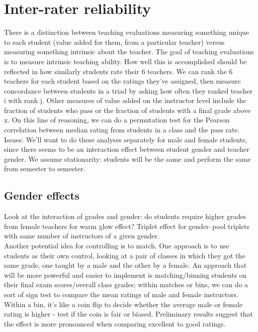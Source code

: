 \documentclass[12pt]{article}
\begin{document}
\section{Inter-rater reliability}
There is a distinction between teaching evaluations measuring something unique to each student 
(value added for them, from a particular teacher) versus 
measuring something intrinsic about the teacher.  
The goal of teaching evaluations is to measure intrinsic teaching ability.  
How well this is accomplished should be reflected in how similarly 
students rate their 6 teachers.
We can rank the 6 teachers for each student based on the ratings 
they've assigned, then measure concordance between students in a triad by asking how often they ranked teacher i with rank j.
Other measures of value added on the instructor level include the fraction of 
students who pass or the fraction of students with a final grade above x.  
On this line of reasoning, we can do a permutation test for the 
Pearson correlation between median rating from students in a class and the pass rate.
Issues:
We'll want to do these analyses separately for male and female students, 
since there seems to be an interaction effect between student gender and teacher gender.
We assume stationarity: students will be the same and perform the same from semester to semester.

\subsection{Gender effects}
Look at the interaction of grades and gender: 
do students require higher grades from female teachers for warm glow effect?
Triplet effect for gender--pool triplets with same number of instructors of a given gender. \\

Another potential idea for controlling is to match. One approach is to use students as their own control, looking at a pair of classes in which they got the same grade, one taught by a male and the other by a female. An approach that will be more powerful and easier to implement is matching/binning students on their final exam scores/overall class grades; within matches or bins, we can do a sort of sign test to compare the mean ratings of male and female instructors. Within a bin, it's like a coin flip to decide whether the average male or female rating is higher - test if the coin is fair or biased. Preliminary results suggest that the effect is more pronounced when comparing excellent to good ratings.
\end{document}
